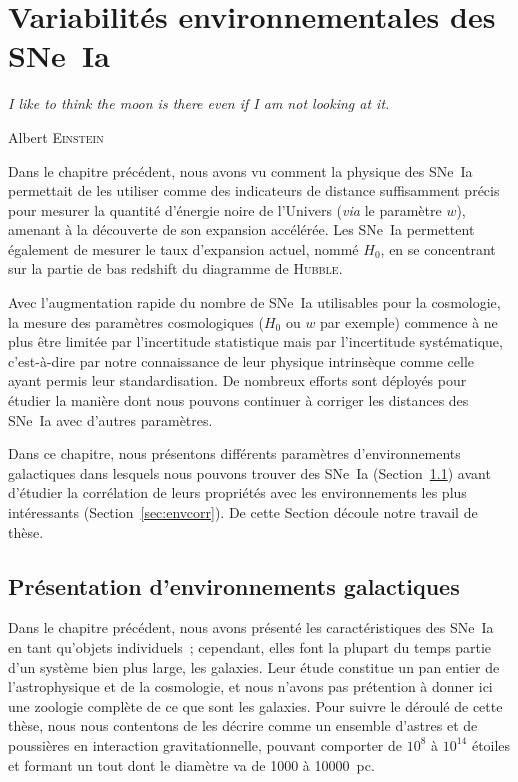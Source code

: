 \documentclass[../main/main.tex]{subfiles}
\begin{document}

\chapter{Variabilit\'es environnementales des SNe~Ia}\label{ch:env}

\epigraph{\openquote \textit{I like to think the moon is there even if I am not
looking at it.}\closequote}{Albert \textsc{Einstein}}

Dans le chapitre précédent, nous avons vu comment la physique des SNe~Ia
permettait de les utiliser comme des indicateurs de distance suffisamment précis
pour mesurer la quantité d'énergie noire de l'Univers (\textit{via} le paramètre
$w$), amenant à la découverte de son expansion accélérée. Les SNe~Ia permettent
également de mesurer le taux d'expansion actuel, nommé $H_0$, en se concentrant
sur la partie de bas redshift du diagramme de \textsc{Hubble}.

Avec l'augmentation rapide du nombre de SNe~Ia utilisables pour la cosmologie,
la mesure des paramètres cosmologiques ($H_0$ ou $w$ par exemple) commence à ne
plus être limitée par l'incertitude statistique mais par l'incertitude
systématique, c'est-à-dire par notre connaissance de leur physique intrinsèque
comme celle ayant permis leur standardisation. De nombreux efforts sont déployés
pour étudier la manière dont nous pouvons continuer à corriger les distances des
SNe~Ia avec d'autres paramètres.

Dans ce chapitre, nous présentons différents paramètres d'environnements
galactiques dans lesquels nous pouvons trouver des SNe~Ia
(Section~\ref{sec:envpres}) avant d'étudier la corrélation de leurs propriétés
avec les environnements les plus intéressants (Section~\ref{sec:envcorr}). De
cette Section découle notre travail de thèse.

\vfill
\minitoc
\vfill
\newpage

\section{Présentation d'environnements galactiques}\label{sec:envpres}

Dans le chapitre précédent, nous avons présenté les caractéristiques des SNe~Ia
en tant qu'objets individuels~; cependant, elles font la plupart du temps
partie d'un système bien plus large, les galaxies. Leur étude constitue un pan
entier de l'astrophysique et de la cosmologie, et nous n'avons pas prétention à
donner ici une zoologie complète de ce que sont les galaxies. Pour suivre le
déroulé de cette thèse, nous nous contentons de les décrire comme un ensemble
d'astres et de poussières en interaction gravitationnelle, pouvant comporter de
$10^8$ à $10^{14}$ étoiles et formant un tout dont le diamètre va de \num{1000}
à \SI{10000}{pc}.
\end{document}
